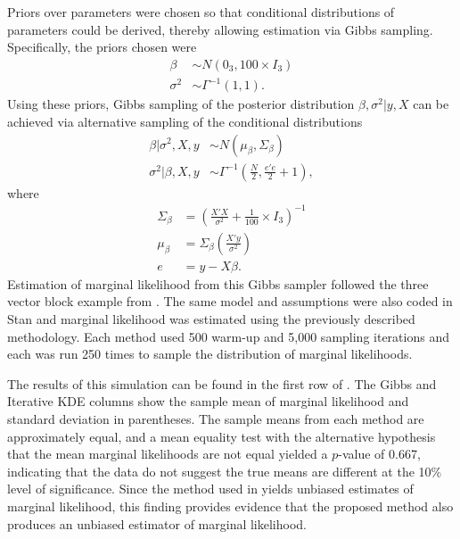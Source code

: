 \documentclass[twocolumn]{article}
\begin{document}
Priors over parameters were chosen so that conditional distributions of parameters could be derived, thereby allowing estimation via Gibbs sampling. Specifically, the priors chosen were
\begin{subequations}
\begin{align}
	\beta &\sim N(0_3, 100\times I_3)\\
	\sigma^2 &\sim \Gamma^{-1}(1, 1).
\end{align}
\end{subequations}
Using these priors, Gibbs sampling of the posterior distribution $\beta, \sigma^2|y, X$ can be achieved via alternative sampling of the conditional distributions
\begin{subequations}
\begin{align}
	\beta|\sigma^2, X, y &\sim N(\mu_\beta, \Sigma_\beta) \\
	\sigma^2|\beta, X, y &\sim \Gamma^{-1}\left(\frac{N}2, \frac{e'e}2 + 1\right),
\end{align}
\end{subequations}
where
\begin{subequations}
\begin{align}
	\Sigma_\beta &= \left(\frac{X'X}{\sigma^2} + \frac1{100}\times I_3\right)^{-1}\\
	\mu_\beta &= \Sigma_\beta\left(\frac{X'y}{\sigma^2}\right)\\
	e &= y - X\beta.
\end{align}
\end{subequations}
Estimation of marginal likelihood from this Gibbs sampler followed the three vector block example from \cite{Chib}. The same model and assumptions were also coded in Stan and marginal likelihood was estimated using the previously described methodology. Each method used 500 warm-up and 5,000 sampling iterations and each was run 250 times to sample the distribution of marginal likelihoods.

The results of this simulation can be found in the first row of . The Gibbs and Iterative KDE columns show the sample mean of marginal likelihood and standard deviation in parentheses. The sample means from each method are approximately equal, and a mean equality test with the alternative hypothesis that the mean marginal likelihoods are not equal yielded a $p$-value of 0.667, indicating that the data do not suggest the true means are different at the 10\% level of significance. Since the method used in \cite{Chib} yields unbiased estimates of marginal likelihood, this finding provides evidence that the proposed method also produces an unbiased estimator of marginal likelihood.
\end{document}
